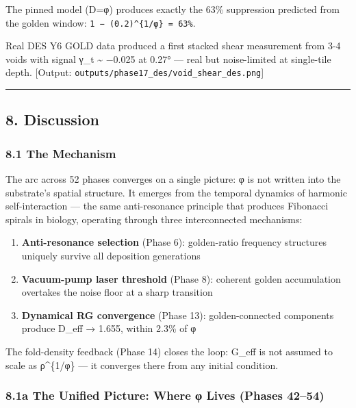 \documentclass[
]{article}
\providecommand{\tightlist}{%
  \setlength{\itemsep}{0pt}\setlength{\parskip}{0pt}}
\begin{document}
The pinned model (D=φ) produces exactly the 63\% suppression predicted
from the golden window: \texttt{1\ −\ (0.2)\^{}\{1/φ\}\ =\ 63\%}.

Real DES Y6 GOLD data produced a first stacked shear measurement from
3-4 voids with signal γ\_t \textasciitilde{} −0.025 at 0.27° --- real
but noise-limited at single-tile depth. {[}Output:
\texttt{outputs/phase17\_des/void\_shear\_des.png}{]}

\begin{center}\rule{0.5\linewidth}{0.5pt}\end{center}

\subsection{8. Discussion}\label{discussion}

\subsubsection{8.1 The Mechanism}\label{the-mechanism}

The arc across 52 phases converges on a single picture: φ is not written
into the substrate's spatial structure. It emerges from the temporal
dynamics of harmonic self-interaction --- the same anti-resonance
principle that produces Fibonacci spirals in biology, operating through
three interconnected mechanisms:

\begin{enumerate}
\def\labelenumi{\arabic{enumi}.}
\tightlist
\item
  \textbf{Anti-resonance selection} (Phase 6): golden-ratio frequency
  structures uniquely survive all deposition generations
\item
  \textbf{Vacuum-pump laser threshold} (Phase 8): coherent golden
  accumulation overtakes the noise floor at a sharp transition
\item
  \textbf{Dynamical RG convergence} (Phase 13): golden-connected
  components produce D\_eff → 1.655, within 2.3\% of φ
\end{enumerate}

The fold-density feedback (Phase 14) closes the loop: G\_eff is not
assumed to scale as ρ\^{}\{1/φ\} --- it converges there from any initial
condition.

\subsubsection{8.1a The Unified Picture: Where φ Lives (Phases
42--54)}\label{a-the-unified-picture-where-ux3c6-lives-phases-4254}
\end{document}
